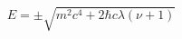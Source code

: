 \begin{equation}
E=\pm \sqrt{m^{2}c^{4}+2\hbar c\lambda \left( \nu +1\right) }  \label{eq25}
\end{equation}


